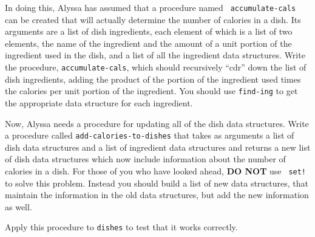 In doing this, Alyssa has assumed that a procedure named {\tt
accumulate-cals} can be created that will actually determine the
number of calories in a dish.  Its arguments are a list of dish
ingredients, each element of which is a list of two elements, the name
of the ingredient and the amount of a unit portion of the ingredient
used in the dish, and a list of all the ingredient data structures.
Write the procedure, {\tt accumulate-cals}, which should recursively
``cdr'' down the list of dish ingredients, adding the product of the
portion of the ingredient used times the calories per unit portion of
the ingredient.  You should use {\tt find-ing} to get the appropriate
data structure for each ingredient.


Now, Alyssa needs a procedure for updating all of the dish data
structures.  Write a procedure called {\tt add-calories-to-dishes} that
takes as arguments a list of dish data structures and a list of
ingredient data structures and returns a new list of dish data
structures which now include information about the number of calories in
a dish.  For those of you who have looked ahead, {\bf DO NOT} use {\tt
set!} to solve this problem.  Instead you should build a list of new
data structures, that maintain the information in the old data
structures, but add the new information as well.


Apply this procedure to {\tt dishes} to test that it works correctly.

